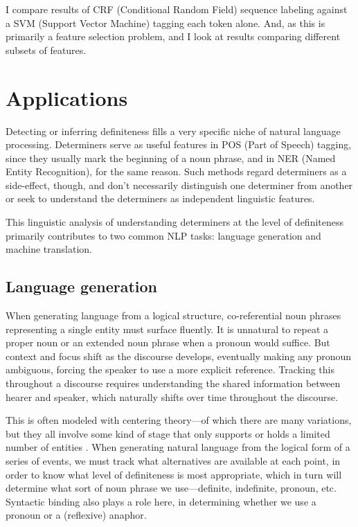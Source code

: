\documentclass[11pt]{article}\usepackage{graphicx, color}
\begin{document}
I compare results of CRF (Conditional Random Field) sequence labeling against a SVM (Support Vector Machine) tagging each token alone.
And, as this is primarily a feature selection problem, and I look at results comparing different subsets of features.







\section{Applications}
Detecting or inferring definiteness fills a very specific niche of natural language processing. Determiners serve as useful features in POS (Part of Speech) tagging, since they usually mark the beginning of a noun phrase, and in NER (Named Entity Recognition), for the same reason. Such methods regard determiners as a side-effect, though, and don't necessarily distinguish one determiner from another or seek to understand the determiners as independent linguistic features.

This linguistic analysis of understanding determiners at the level of definiteness primarily contributes to two common NLP tasks: language generation and machine translation.



\subsection{Language generation}
When generating language from a logical structure, co-referential noun phrases representing a single entity must surface fluently. It is unnatural to repeat a proper noun or an extended noun phrase when a pronoun would suffice. But context and focus shift as the discourse develops, eventually making any pronoun ambiguous, forcing the speaker to use a more explicit reference. Tracking this throughout a discourse requires understanding the shared information between hearer and speaker, which naturally shifts over time throughout the discourse.

This is often modeled with centering theory---of which there are many variations, but they all involve some kind of stage that only supports or holds a limited number of entities \citep{brennan:1987, grosz:1995, beaver:2000}. When generating natural language from the logical form of a series of events, we must track what alternatives are available at each point, in order to know what level of definiteness is most appropriate, which in turn will determine what sort of noun phrase we use---definite, indefinite, pronoun, etc. Syntactic binding also plays a role here, in determining whether we use a pronoun or a (reflexive) anaphor.
\end{document}
